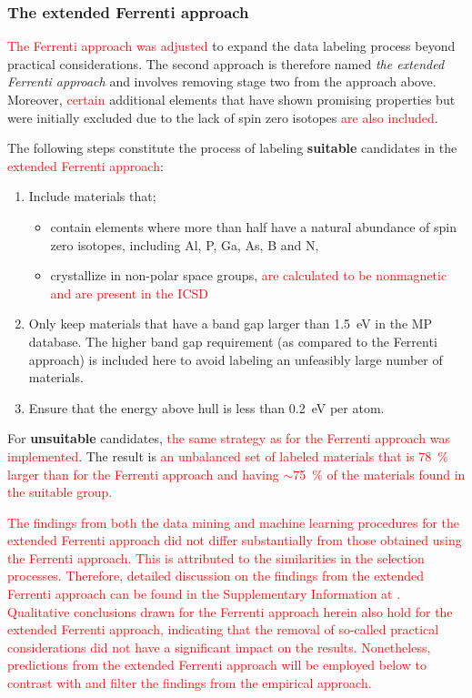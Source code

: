 \documentclass[superscriptaddress,unsortedaddress,
 amsmath,amssymb,
 aps,
]{revtex4-2}
\newcommand{\mrk}[1]{\textcolor{red}{#1}}
\begin{document}
\subsubsection*{The extended Ferrenti approach}
\mrk{The Ferrenti approach was adjusted} to expand the data labeling process beyond practical  considerations. The second approach is therefore named \emph{the extended Ferrenti approach} and involves removing stage two from the approach above. Moreover, \mrk{certain} additional elements that have shown promising properties but were initially excluded due to the lack of spin zero isotopes \mrk{are also included}. 

The following steps constitute the process of labeling \textbf{suitable} candidates in the \mrk{extended Ferrenti approach}:
\begin{enumerate}
    \item Include materials that; 
    \begin{itemize}
        \item contain elements where more than half have a natural abundance of spin zero isotopes, including Al, P, Ga, As, B and N, 
        \item crystallize in non-polar space groups,
        \mrk{are calculated to be nonmagnetic and are present in the ICSD} 
    \end{itemize}
    \item Only keep materials that have a band gap larger than \SI{1.5}{\electronvolt} in the MP database. The higher band gap requirement (as compared to the Ferrenti approach) is included here to avoid labeling an unfeasibly large number of materials. 
    \item Ensure that the energy above hull is less than \SI{0.2}{\electronvolt} per atom. 
\end{enumerate}

For \textbf{unsuitable} candidates, \mrk{the same strategy as for the Ferrenti approach was implemented}. The result is \mrk{an unbalanced set of labeled materials that is   \SI{78}{\percent} larger than for the Ferrenti approach and having $\sim$\SI{75}{\percent} of the materials found in the suitable group.} 

\mrk{The findings from both the data mining and machine learning procedures for the extended Ferrenti approach did not differ substantially from those obtained using the Ferrenti approach. This is attributed to the similarities in the selection processes. Therefore, detailed discussion on the findings from the extended Ferrenti approach can be found in the Supplementary Information at \cite{supplementary}. Qualitative conclusions drawn for the Ferrenti approach herein also hold for the extended Ferrenti approach, indicating that the removal of so-called practical considerations did not have a significant impact on the results. Nonetheless, predictions from the extended Ferrenti approach will be employed below to contrast with and filter the findings from the empirical approach. }
\end{document}
